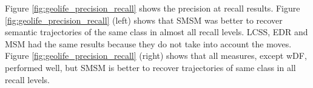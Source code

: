 \documentclass[12pt]{article}
\begin{document}
{Figure {\ref{fig:geolife_precision_recall}} shows the precision at recall results. Figure {\ref{fig:geolife_precision_recall}} (left)  shows that SMSM was better to recover semantic trajectories of the same class in almost all recall levels. LCSS, EDR and MSM had the same results because they do not take into account the moves. Figure {\ref{fig:geolife_precision_recall}} (right) shows that all measures, except wDF, performed well, but SMSM is better to recover trajectories of same class in all recall levels. }
\end{document}
